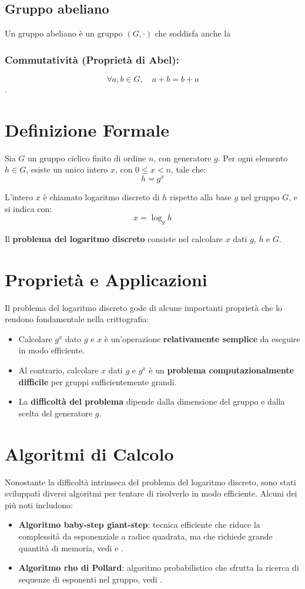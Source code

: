 \documentclass[a4paper,12pt]{report}
\begin{document}
\subsection*{Gruppo abeliano}
Un gruppo abeliano è un gruppo \( (G, \cdot) \) che soddisfa anche la 
\subsubsection*{Commutatività (Proprietà di Abel):} \[ \forall a, b \in  G, \quad a + b = b + a \].


\section{Definizione Formale}
Sia $G$ un gruppo ciclico finito di ordine $n$, con generatore $g$. Per ogni elemento $h \in G$, esiste un unico intero $x$, con $0 \leq x < n$, tale che:
\[h = g^x\]

L'intero $x$ è chiamato logaritmo discreto di $h$ rispetto alla base $g$ nel gruppo $G$, e si indica con:
\[x = \log_g h\]

Il \textbf{problema del logaritmo discreto} consiste nel calcolare $x$ dati $g$, $h$ e $G$. 

\section{Proprietà e Applicazioni}
Il problema del logaritmo discreto gode di alcune importanti proprietà che lo rendono fondamentale nella crittografia:

\begin{itemize}
    \item Calcolare $g^x$ dato $g$ e $x$ è un'operazione \textbf{relativamente semplice }da eseguire in modo efficiente.
    \item Al contrario, calcolare $x$ dati $g$ e $g^x$ è un \textbf{problema computazionalmente difficile} per gruppi sufficientemente grandi.
    \item La \textbf{difficoltà del problema} dipende dalla dimensione del gruppo e dalla scelta del generatore $g$.
\end{itemize}

\section{Algoritmi di Calcolo}
Nonostante la difficoltà intrinseca del problema del logaritmo discreto, sono stati sviluppati diversi algoritmi per tentare di risolverlo in modo efficiente. Alcuni dei più noti includono:
\begin{itemize}
    \item \textbf{Algoritmo baby-step giant-step}: tecnica efficiente che riduce la complessità da esponenziale a radice quadrata, ma che richiede grande quantità di memoria, vedi \cite{silverman2009elliptic} e \cite{coron2011baby}.
    \item \textbf{Algoritmo rho di Pollard}: algoritmo probabilistico che sfrutta la ricerca di sequenze di esponenti nel gruppo, vedi \cite{nickerson2020collision}.
\end{itemize}
\end{document}
